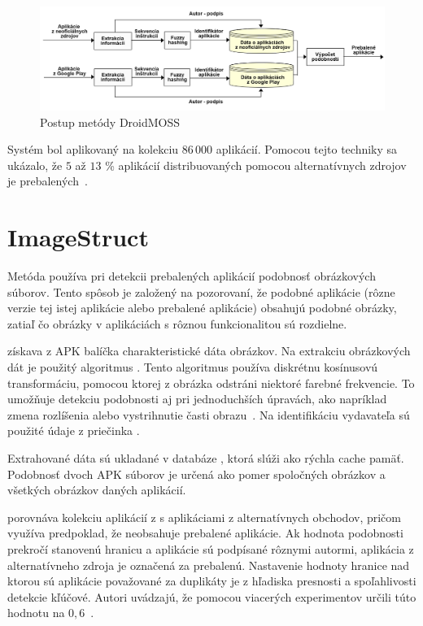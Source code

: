\begin{figure}[htb]
  \begin{center}
    \includegraphics[width=130mm]{images/DroidMoss.png}
  \end{center}
  \caption{Postup metódy DroidMOSS}
  \label{fig:strukturaDroidMoss}
\end{figure}


Systém  bol aplikovaný na kolekciu $86\,000$ aplikácií. Pomocou tejto techniky sa ukázalo, že $5$ až $13$ \% aplikácií distribuovaných pomocou alternatívnych zdrojov je prebalených~\cite{DetectingRepackagedZhou}.


\section{ImageStruct}

Metóda  používa pri detekcii prebalených aplikácií podobnosť obrázkových súborov. Tento spôsob je založený na pozorovaní, že podobné aplikácie (rôzne verzie tej istej aplikácie alebo prebalené aplikácie) obsahujú podobné obrázky, zatiaľ čo obrázky v aplikáciách s rôznou funkcionalitou sú rozdielne. 

 získava z APK balíčka charakteristické dáta obrázkov. Na extrakciu obrázkových dát je použitý algoritmus . Tento algoritmus používa diskrétnu kosínusovú transformáciu, pomocou ktorej z obrázka odstráni niektoré farebné frekvencie. To umožňuje detekciu podobnosti aj pri jednoduchších úpravách, ako napríklad zmena rozlíšenia alebo vystrihnutie časti obrazu~\cite{pHash}. Na identifikáciu vydavateľa sú použité údaje z priečinka .


Extrahované dáta sú ukladané v databáze , ktorá slúži ako rýchla cache pamäť. 
Podobnosť dvoch APK súborov je určená ako pomer spoločných obrázkov a všetkých obrázkov daných aplikácií.

  porovnáva kolekciu aplikácií z  s aplikáciami z alternatívnych obchodov, pričom využíva predpoklad, že  neobsahuje prebalené aplikácie. Ak hodnota podobnosti prekročí stanovenú hranicu a aplikácie sú podpísané rôznymi autormi, aplikácia z alternatívneho zdroja je označená za prebalenú.
Nastavenie hodnoty hranice nad ktorou sú aplikácie považované za duplikáty je z hľadiska presnosti a spoľahlivosti detekcie kľúčové. Autori uvádzajú, že pomocou viacerých experimentov určili túto hodnotu na $0,6$~\cite{ImageStruct}.

